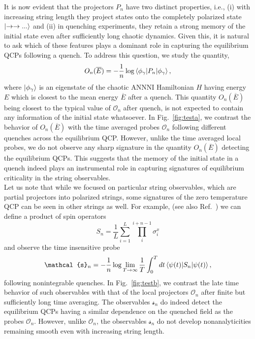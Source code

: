 \documentclass[aps,prx,twocolumn]{revtex4-2}
\begin{document}
{{It is now evident that the projectors $P_n$ have two distinct properties, i.e., (i) with increasing string length they project states onto the completely polarized state $\ket{\rightarrow\rightarrow...}$ and (ii) in quenching experiments, they retain a strong memory of the initial state even after sufficiently long chaotic dynamics. Given this, it is natural to ask which of these features plays a dominant role in capturing the equilibrium QCPs following a quench. To address this question, we study the quantity,}
{\begin{equation}
O_n(\overline{E})=-\frac{1}{n}\log\braket{\phi_{\gamma}|P_n|\phi_{\gamma}},
\end{equation}
where $\ket{\phi_{\gamma}}$ is an eigenstate of the chaotic ANNNI Hamiltonian $H$ having energy $E$ which is closest to the mean energy $\overline{E}$ after a quench. This quantity $O_n(\overline{E})$ being closest to the typical value of $\mathcal{O}_n$ after quench, is not expected to contain any information of the initial state whatsoever. In Fig.~\ref{fig:testa}, we contrast the behavior of $O_n(\overline{E})$ with the time averaged probes $\mathcal{O}_n$ following different quenches across the equilibrium QCP. However, unlike the time averaged local probes, we do not observe any sharp signature in the quantity $O_n(\overline{E})$ detecting the equilibrium QCPs. This suggests that the memory of the initial state in a quench indeed plays an instrumental role in capturing signatures of equilibrium criticality in the string observables.}\\

 {Let us note that while we focused on particular string observables,  which are partial projectors into polarized strings, some signatures of the zero temperature QCP can be seen in other strings as well.  For example, (see also Ref.~\cite{asmi21}) we can define a product of spin operators
\begin{equation}
S_n=\frac{1}{L}\sum\limits_{i=1}^{L}\prod\limits_{i}^{i+n-1}\sigma_i^x
\end{equation}
and observe the time insensitive probe 
\begin{equation}
\mathcal{s}_n=-\frac{1}{n}\log\lim\limits_{T\rightarrow\infty}\frac{1}{T}\int_{0}^{T}dt\braket{\psi(t)|S_n|\psi(t)},
\end{equation}
following nonintegrable quenches.  In Fig.~\ref{fig:testb}, we contrast the late time behavior of such observables with that of the local projectors $\mathcal{O}_n$ after finite but sufficiently long time averaging. The observables $\mathcal{s}_n$ do indeed detect the equilibrium QCPs having a similar dependence on the quenched field as the probes $\mathcal{O}_n$.  However, unlike $\mathcal{O}_n$, the observables $\mathcal{s}_n$ do not develop nonanalyticities remaining smooth even with increasing string length.  }

}
\end{document}
